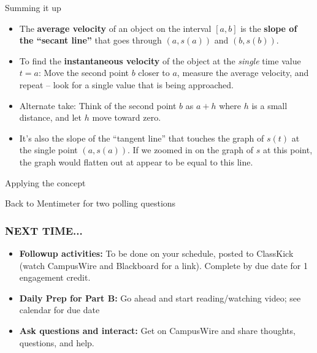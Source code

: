 \documentclass{beamer}
\begin{document}
\begin{frame}{Summing it up}
    \begin{itemize}
        \item The \textbf{average velocity} of an object on the interval $[a,b]$ is the \textbf{slope of the ``secant line''} that goes through $(a,s(a))$ and $(b, s(b))$. \pause
        \item \alert{To find the \textbf{instantaneous velocity} of the object at the \emph{single} time value $t = a$: Move the second point $b$ closer to $a$, measure the average velocity, and repeat -- look for a single value that is being approached.} \pause
        \item Alternate take: Think of the second point $b$ as $a + h$ where $h$ is a small distance, and let $h$ move toward zero. \pause
        \item \alert{It's also the slope of the ``tangent line'' that touches the graph of $s(t)$ at the single point $(a,s(a))$. If we zoomed in on the graph of $s$ at this point, the graph would flatten out at appear to be equal to this line.} \pause
    \end{itemize}
\end{frame}

\begin{frame}{Applying the concept}
    
    \begin{center}
        Back to Mentimeter for two polling questions
    \end{center}
    
\end{frame}

    




\begin{frame}
    \frametitle{NEXT TIME...}

    \begin{itemize}
        \item \textbf{Followup activities:} To be done on your schedule, posted to ClassKick (watch CampusWire and Blackboard for a link). Complete by due date for 1 engagement credit. 
        \item \textbf{Daily Prep for Part B:} Go ahead and start reading/watching video; see calendar for due date
        \item \textbf{Ask questions and interact:} Get on CampusWire and share thoughts, questions, and help. 
    \end{itemize}

\end{frame}
\end{document}
